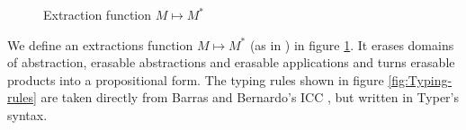 \documentclass[10pt]{article}
\begin{document}
\begin{figure}[h]
  \label{fig:*}
  \centering
  \caption{Extraction function $M \mapsto M^*$}
\end{figure}

We define an extractions function $M \mapsto M^*$ (as in \cite{bruno}) in figure \ref{fig:*}. It erases domains of abstraction, erasable abstractions and erasable applications and turns erasable products into a propositional form. The typing rules shown in figure \ref{fig:Typing-rules} are taken directly from Barras and Bernardo's ICC \cite{bruno}, but written in Typer's syntax.
\end{document}
